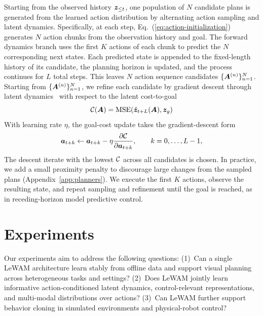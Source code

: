 \documentclass{article} %
\newcommand{\lead}[1]{\textbf{#1}}
\begin{document}
Starting from the observed history ${\bm{z}}_{\leq t}$, one population of $N$ candidate plans is generated from the learned action distribution by alternating action sampling and latent dynamics. Specifically, at each step, Eq.~(\ref{eq:action-initialization}) generates $N$ action chunks from the observation history and goal. The forward dynamics branch uses
the first $K$ actions of each chunk to predict the $N$ corresponding next states.
Each predicted state is appended to the fixed-length history of its candidate, the planning horizon is updated, and the process continues for $L$ total steps. This leaves $N$ action sequence candidates $\{{\bm{A}}^{(n)}\}_{n=1}^N$. 
Starting from $\{{\bm{A}}^{(n)}\}_{n=1}^N$, we refine each candidate by gradient descent through latent dynamics~\citep{henaff2017discrete,jyothir2023gradient} with respect to the latent cost-to-goal
\begin{equation}
     {\mathcal{C}}({\bm{A}})
     =\operatorname{MSE}\!\left(\hat{{\bm{z}}}_{t+L}({\bm{A}}),{\bm{z}}_g\right)
     \label{eq:lewam-gradient-planning}
\end{equation}
With learning rate $\eta$, the goal-cost update takes the gradient-descent form
\begin{equation}
    {\bm{a}}_{t+k}\leftarrow{\bm{a}}_{t+k}-\eta\frac{\partial{\mathcal{C}}}{\partial{\bm{a}}_{t+k}},
    \qquad k=0,\ldots,L-1,
    \label{eq:action-gradient-refinement}
\end{equation}
The descent iterate with the lowest ${\mathcal{C}}$ across all candidates is chosen. In practice, we add a small proximity penalty to discourage large changes from the sampled plans (Appendix~\ref{app:planners}). We execute the first $K$ actions, observe the resulting state, and repeat sampling and refinement until the goal is reached, as in receding-horizon model predictive control.


\section{Experiments}
\label{sec:what-joint-buys}
\label{sec:experiments}

Our experiments aim to address the following questions:
(1)~Can a single LeWAM architecture learn stably from offline data and support visual planning across heterogeneous tasks and settings?
(2)~Does LeWAM jointly learn informative action-conditioned latent dynamics, control-relevant representations, and multi-modal distributions over actions?
(3)~Can LeWAM further support behavior cloning in simulated environments and physical-robot control?
\end{document}
